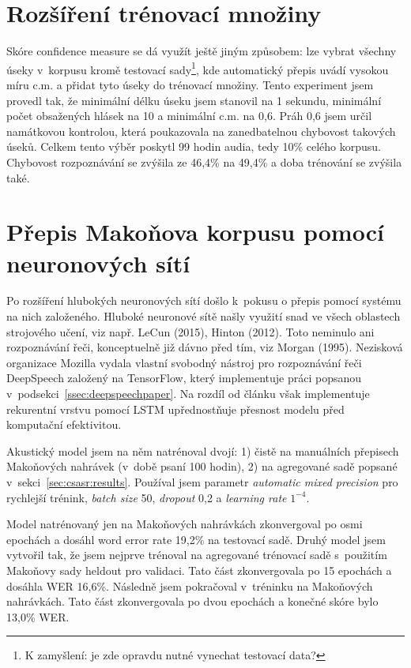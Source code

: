 \section{Rozšíření trénovací množiny}
\label{sec:confident}

Skóre confidence measure se dá využít ještě jiným způsobem: lze vybrat všechny
úseky v~korpusu kromě testovací sady\footnote{K zamyšlení: je zde opravdu nutné
vynechat testovací data?}, kde automatický přepis uvádí vysokou míru
c.m. a přidat tyto úseky do trénovací množiny. Tento experiment jsem provedl
tak, že minimální délku úseku jsem stanovil na 1 sekundu, minimální počet
obsažených hlásek na 10 a minimální c.m. na 0,6. Práh 0,6 jsem určil namátkovou
kontrolou, která poukazovala na zanedbatelnou chybovost takových úseků. Celkem
tento výběr poskytl 99 hodin audia, tedy 10\% celého korpusu.
Chybovost rozpoznávání se zvýšila ze 46,4\% na 49,4\% a doba trénování
se zvýšila také.

\section{Přepis Makoňova korpusu pomocí neuronových sítí}
\label{sec:deepspeech}

Po rozšíření hlubokých neuronových sítí došlo k~pokusu o přepis pomocí systému
na nich založeného. 
Hluboké neuronové sítě našly využití
snad ve všech oblastech strojového učení, viz např. LeCun
(2015)\cite{lecun2015deep}, Hinton (2012)\cite{hinton2012deep}. Toto neminulo ani
rozpoznávání řeči, konceptuelně již dávno před tím, viz Morgan
(1995)\cite{morgan1995neural}.
Nezisková organizace Mozilla vydala vlastní svobodný nástroj pro rozpoznávání
řeči DeepSpeech\cite{hannun2014deep} založený na
TensorFlow\cite{abadi2016tensorflow}, který implementuje práci popsanou
v~podsekci~\ref{ssec:deepspeechpaper}.
Na rozdíl od článku\cite{hannun2014deep} však implementuje rekurentní vrstvu
pomocí LSTM upřednostňuje přesnost modelu před komputační efektivitou.

Akustický model jsem na něm natrénoval dvojí: 1) čistě na manuálních přepisech
Makoňových nahrávek (v~době psaní 100 hodin), 2) na agregované sadě popsané
v~sekci~\ref{sec:csasr:results}. Používal jsem parametr \textit{automatic mixed
precision} pro rychlejší trénink, \textit{batch size} 50, \textit{dropout} 0,2 a
\textit{learning rate} $1^{-4}$.

Model natrénovaný jen na Makoňových nahrávkách zkonvergoval po osmi epochách a
dosáhl word error rate 19,2\% na testovací sadě. Druhý model jsem vytvořil tak,
že jsem nejprve trénoval na agregované trénovací sadě s~použitím Makoňovy
sady heldout pro validaci. Tato část zkonvergovala po 15 epochách a dosáhla WER
16,6\%. Následně jsem pokračoval v~tréninku na Makoňových nahrávkách. Tato část
zkonvergovala po dvou epochách a konečné skóre bylo 13,0\% WER.

